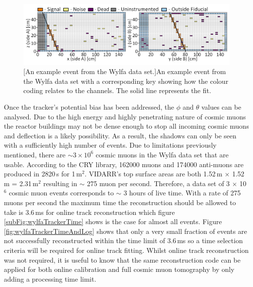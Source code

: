 \begin{figure}[!h]
 \centering
 \includegraphics[width=\linewidth]{Chapter6/Figs/Raster/newExampleEventWylfaMedText.png}
 [An example event from the Wylfa data set.]{An example event from the Wylfa data set with a corresponding key showing how the colour coding relates to the channels. The solid line represents the fit.} 
 \label{fig:3000ExampleEventWithKey}
\end{figure}

Once the tracker's potential bias has been addressed, the $\phi$ and $\theta$ values can be analysed. Due to the high energy and highly penetrating nature of cosmic muons \cite{Olive_2014} the reactor buildings may not be dense enough to stop all incoming cosmic muons and deflection is a likely possibility. As a result, the shadows can only be seen with a sufficiently high number of events. Due to limitations previously mentioned, there are $\sim 3 \times 10^6$ cosmic muons in the Wylfa data set that are usable. According to the CRY library, \cite{ieee_cry_2007} 162000 muons and 174000 anti-muons are produced in 2820\,s for 1\,m$^2$. VIDARR's top surface areas are both 1.52\,m $\times$ 1.52\,m = 2.31\,m$^2$ resulting in $\sim$ 275 muon per second. Therefore, a data set of 3 $\times$ 10$^6$ cosmic muon events corresponds to $\sim$ 3 hours of live time. With a rate of 275 muons per second the maximum time the reconstruction should be allowed to take is 3.6\,ms for online track reconstruction which figure \ref{subFig:wylfaTrackerTime} shows is the case for almost all events. Figure \ref{fig:wylfaTrackerTimeAndLog} shows that only a very small fraction of events are not successfully reconstructed within the time limit of 3.6\,ms so a time selection criteria will be required for online track fitting. Whilst online track reconstruction was not required, it is useful to know that the same reconstruction code can be applied for both online calibration and full cosmic muon tomography by only adding a processing time limit. 

